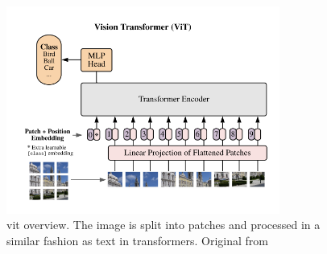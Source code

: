 \begin{figure}[H]
    \centering
    \includegraphics[width=0.8\textwidth]{fig/rel/images/vit_schema.png}
    \caption{\gls{vit} overview. The image is split into patches and processed in a similar fashion as text in transformers. Original from \cite{dosovitskiy2020image}}
    \label{fig:rel_vit}
\end{figure}